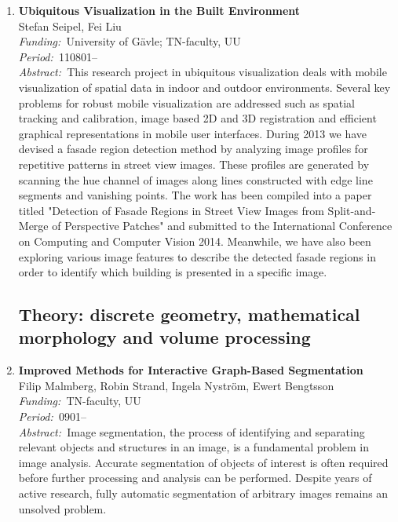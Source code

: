 \documentclass[10pt, a4paper]{article}
\newcommand{\period}{\emph{Period:~}}
\newcommand{\aabstract}[1]{\emph{Abstract:~}#1}
\newcommand{\ffunding}[1]{\emph{Funding:~}#1\\}
\newcommand{\pperiod}[1]{\emph{Period:~}#1\\}
\begin{document}
\begin{enumerate}

\item \textbf{Ubiquitous Visualization in the Built Environment}\\
Stefan Seipel, Fei Liu\\
\ffunding{University of G\"{a}vle; TN-faculty, UU}
\pperiod{110801--}%
\aabstract{This research project in ubiquitous visualization deals with mobile visualization of spatial data in indoor and outdoor environments. Several key problems for robust mobile visualization are addressed such as spatial tracking and calibration, image based 2D and 3D registration and efficient graphical representations in mobile user interfaces. During 2013 we have devised a fasade region detection method by analyzing image profiles for repetitive patterns in street view images. These profiles are generated by scanning the hue channel of images along lines constructed with edge line segments and vanishing points. The work has been compiled into a paper titled "Detection of Fasade Regions in Street View Images from Split-and-Merge of Perspective Patches" and submitted to the International Conference on Computing and Computer Vision 2014. Meanwhile, we have also been exploring various image features to describe the detected fasade regions in order to identify which building is presented in a specific image.}

\clearpage


\subsection{Theory: discrete geometry, mathematical morphology and volume processing}

\item
\label{project:interactive_segmentation}
\textbf{Improved Methods for Interactive Graph-Based Segmentation}\\
Filip Malmberg, Robin Strand, Ingela Nystr\"{o}m, Ewert Bengtsson\\
\ffunding{TN-faculty, UU}
\period{0901--}\\
\aabstract{Image segmentation, the process of identifying and separating relevant objects and structures in an image, is a fundamental problem in image analysis. Accurate segmentation of objects of interest is often required before further processing and analysis can be performed. Despite years of active research, fully automatic segmentation of arbitrary images remains an unsolved problem. 

}
\end{enumerate}
\end{document}
